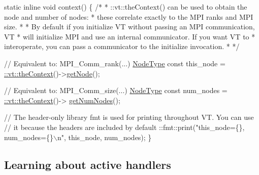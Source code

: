 \begin{DoxyCodeInclude}
\textcolor{keyword}{static} \textcolor{keyword}{inline} \textcolor{keywordtype}{void} context() \{
  \textcolor{comment}{/*}
\textcolor{comment}{   *  ::vt::theContext() can be used to obtain the node and number of nodes:}
\textcolor{comment}{   *  these correlate exactly to the MPI ranks and MPI size.}
\textcolor{comment}{   *}
\textcolor{comment}{   *  By default if you initialize VT without passing an MPI communication, VT}
\textcolor{comment}{   *  will initialize MPI and use an internal communicator. If you want VT to}
\textcolor{comment}{   *  interoperate, you can pass a communicator to the initialize invocation.}
\textcolor{comment}{   *}
\textcolor{comment}{   */}

  \textcolor{comment}{// Equivalent to: MPI\_Comm\_rank(...)}
  \hyperlink{namespacevt_a866da9d0efc19c0a1ce79e9e492f47e2}{NodeType} \textcolor{keyword}{const} this\_node = \hyperlink{namespacevt_a26551fe0e6e6a1371111df5b12c7e92c}{::vt::theContext}()->\hyperlink{structvt_1_1ctx_1_1_context_a0d52c263ce8516546a67443d9a86fa5f}{getNode}();

  \textcolor{comment}{// Equivalent to: MPI\_Comm\_size(...)}
  \hyperlink{namespacevt_a866da9d0efc19c0a1ce79e9e492f47e2}{NodeType} \textcolor{keyword}{const} num\_nodes = \hyperlink{namespacevt_a26551fe0e6e6a1371111df5b12c7e92c}{::vt::theContext}()->
      \hyperlink{structvt_1_1ctx_1_1_context_a7f41071aadf6d5fa9e1b6c703c5ff19d}{getNumNodes}();

  \textcolor{comment}{// The header-only library fmt is used for printing throughout VT. You can use}
  \textcolor{comment}{// it because the headers are included by default}
  ::fmt::print(\textcolor{stringliteral}{"this\_node=\{\}, num\_nodes=\{\}\(\backslash\)n"}, this\_node, num\_nodes);
\}
\end{DoxyCodeInclude}
\hypertarget{tutorial-1b}{}\subsection{Learning about active handlers}\label{tutorial-1b}

